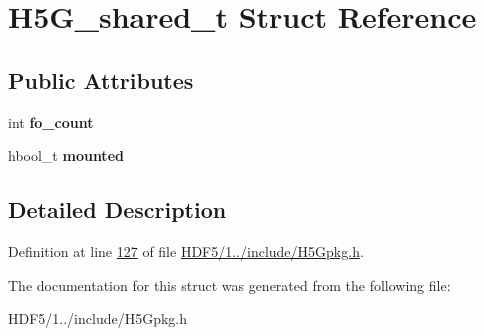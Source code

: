 \hypertarget{struct_h5_g__shared__t}{}\section{H5\+G\+\_\+shared\+\_\+t Struct Reference}
\label{struct_h5_g__shared__t}
\subsection*{Public Attributes}
\begin{DoxyCompactItemize}
\item 
\mbox{\label{struct_h5_g__shared__t_a96ef22ea342ed4ea74002593075907fd}} 
int {\bfseries fo\+\_\+count}
\item 
\mbox{\label{struct_h5_g__shared__t_a55c925b67c7f4359875ea501c782c549}} 
hbool\+\_\+t {\bfseries mounted}
\end{DoxyCompactItemize}


\subsection{Detailed Description}


Definition at line \hyperlink{_h_d_f5_21_810_81_2include_2_h5_gpkg_8h_source_l00127}{127} of file \hyperlink{_h_d_f5_21_810_81_2include_2_h5_gpkg_8h_source}{H\+D\+F5/1../include/\+H5\+Gpkg.\+h}.



The documentation for this struct was generated from the following file\+:\begin{DoxyCompactItemize}
\item 
H\+D\+F5/1../include/\+H5\+Gpkg.\+h\end{DoxyCompactItemize}
